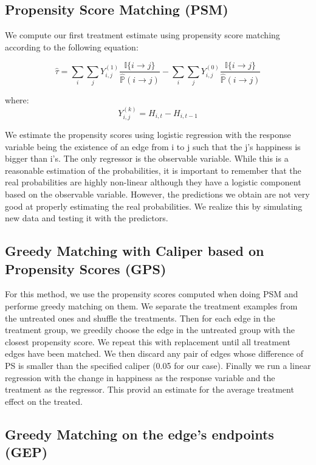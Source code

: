\documentclass[11pt]{article}
\begin{document}
\subsection{Propensity Score Matching (PSM)}

We compute our first treatment estimate using propensity score matching according to the following equation:

$$\hat{\tau} = \sum\limits_i\sum\limits_j Y_{i,j}^{(1)}\frac{\mathbb{I}\{i \rightarrow j\}}{\hat{\mathbb{P}}(i\rightarrow j)} - \sum\limits_i\sum\limits_j Y_{i,j}^{(0)}\frac{\mathbb{I}\{i \rightarrow j\}}{\hat{\mathbb{P}}(i\rightarrow j)}$$

where:
$$Y_{i,j}^{(k)} = H_{i,t}-H_{i,t-1}$$

We estimate the propensity scores using logistic regression with the response variable being the existence of an edge from i to j such that the j's happiness is bigger than i's. The only regressor is the observable variable. While this is a reasonable estimation of the probabilities, it is important to remember that the real probabilities are highly non-linear although they have a logistic component based on the observable variable. However, the predictions we obtain are not very good at properly estimating the real probabilities. We realize this by simulating new data and testing it with the predictors. 

\subsection{Greedy Matching with Caliper based on Propensity Scores (GPS)}
For this method, we use the propensity scores computed when doing PSM and performe greedy matching on them. We separate the treatment examples from the untreated ones and shuffle the treatments. Then for each edge in the treatment group, we greedily choose the edge in the untreated group with the closest propensity score. We repeat this with replacement until all treatment edges have been matched. We then discard any pair of edges whose difference of PS is smaller than the specified caliper (0.05 for our case). Finally we run a linear regression with the change in happiness as the response variable and the treatment as the regressor. This provid an estimate for the average treatment effect on the treated.

\subsection{Greedy Matching on the edge's endpoints (GEP)}
\end{document}
